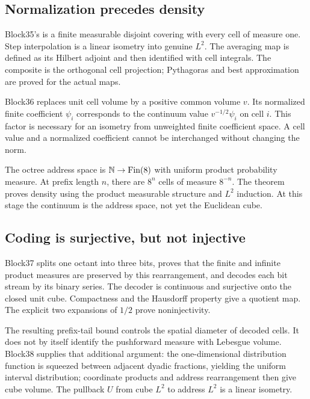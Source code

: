 \subsection{Normalization precedes density}

Block35's  is a finite measurable disjoint covering with every cell of measure one. Step interpolation is a linear isometry into genuine \(L^2\). The averaging map is defined as its Hilbert adjoint and then identified with cell integrals. The composite is the orthogonal cell projection; Pythagoras and best approximation are proved for the actual maps.

Block36 replaces unit cell volume by a positive common volume \(v\). Its normalized finite coefficient \(\psi_i\) corresponds to the continuum value \(v^{-1/2}\psi_i\) on cell \(i\). This factor is necessary for an isometry from unweighted finite coefficient space. A cell value and a normalized coefficient cannot be interchanged without changing the norm.

The octree address space is \(\mathbb N\to\mathrm{Fin}(8)\) with uniform product probability measure. At prefix length \(n\), there are \(8^n\) cells of measure \(8^{-n}\). The theorem  proves density using the product measurable structure and \(L^2\) induction. At this stage the continuum is the address space, not yet the Euclidean cube.

\subsection{Coding is surjective, but not injective}

Block37 splits one octant into three bits, proves that the finite and infinite product measures are preserved by this rearrangement, and decodes each bit stream by its binary series. The decoder is continuous and surjective onto the closed unit cube. Compactness and the Hausdorff property give a quotient map. The explicit two expansions of \(1/2\) prove noninjectivity.

The resulting prefix-tail bound controls the spatial diameter of decoded cells. It does not by itself identify the pushforward measure with Lebesgue volume. Block38 supplies that additional argument: the one-dimensional distribution function is squeezed between adjacent dyadic fractions, yielding the uniform interval distribution; coordinate products and address rearrangement then give cube volume. The pullback \(U\) from cube \(L^2\) to address \(L^2\) is a linear isometry.

